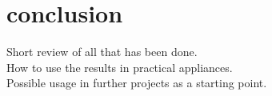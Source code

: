 \chapter{conclusion}

Short review of all that has been done.\\
How to use the results in practical appliances.\\
Possible usage in further projects as a starting point.